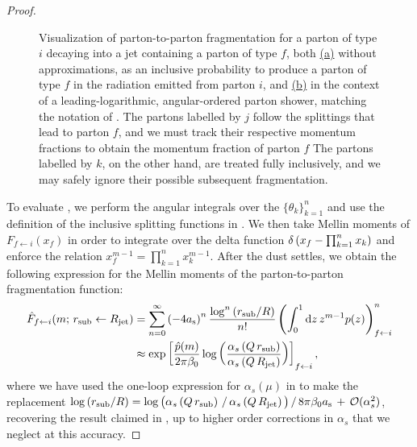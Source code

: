 \begin{proof}
\begin{figure}[t!]
    \caption[Visualization of parton-to-parton fragmentation for a parton of type \(i\) decaying into a jet containing a parton of type \(f\).]
    {
        Visualization of parton-to-parton fragmentation for a parton of type \(i\) decaying into a jet containing a parton of type \(f\), both
        \hyperref[fig:shower:cartoon:fragmentation1]{(a)}
        without approximations, as an inclusive probability to produce a parton of type \(f\) in the radiation emitted from parton \(i\), and
        \hyperref[fig:shower:cartoon:fragmentation2]{(b)}
        in the context of a leading-logarithmic, angular-ordered parton shower, matching the notation of .
        The partons labelled by \(j\) follow the splittings that lead to parton \(f\), and we must track their respective momentum fractions to obtain the momentum fraction of parton \(f\)
        The partons labelled by \(k\), on the other hand, are treated fully inclusively, and we may safely ignore their possible subsequent fragmentation.
    }

    \label{fig:shower:cartoon:fragmentation}
\end{figure}




To evaluate , we perform the angular integrals over the \(\{\theta_k\}_{k = 1}^n\) and use the definition of the inclusive splitting functions in .
%
We then take Mellin moments of \(F_{f\leftarrow i}(x_f)\) in order to integrate over the delta function \(\delta \left(x_f - \prod_{k=1}^n x_k\right)\) and enforce the relation \(x_f^{m-1} = \prod_{k=1}^n x_k^{m-1}\).
%
After the dust settles, we obtain the following expression for the Mellin moments of the parton-to-parton fragmentation function:
\begin{subequations}
\label{eq:ll_fragmentation_repeat}
\begin{align}
    \hat{F}_{f \leftarrow i}(m;\,r_\text{sub} \leftarrow R_\text{jet})
    &=
    \sum_{n=0}^\infty
    \left(-4a_{\mathrm{s}}\right)^n
    \frac{\log^n\left(r_\text{sub}/R\right)}{n!}
    \left(
        \int_0^1 \dd z\,
        z^{m-1} p(z)
    \right)^n_{f\leftarrow i}
    \\
    &\approx
    \exp\left[
        \frac{\hat{p}(m)}{2\pi\beta_0}
        \log\left(
        \frac{
            \alpha_s\left(Q\,r_\text{sub}\right)
        }{
            \alpha_s\left(Q\,R_\text{jet}\right)
        }\right)
    \right]_{f \leftarrow i}
    ,
\end{align}
\end{subequations}
where we have used the one-loop expression for \(\alpha_s(\mu)\) in  to make the replacement \(
    \log\left(r_\text{sub}/R\right)
    =
    \log\big(
        \alpha_s\left(Q\,r_\text{sub}\right)
        \,/\,
        \alpha_s\left(Q\,R_\text{jet}\right)
    \big)
    \,/\,
    8\pi\beta_0a_{\mathrm{s}}
    \,
    +
    \,
    \mathcal{O}(\alpha_s^2)
\), recovering the result claimed in , up to higher order corrections in \(\alpha_s\) that we neglect at this accuracy.
\end{proof}


